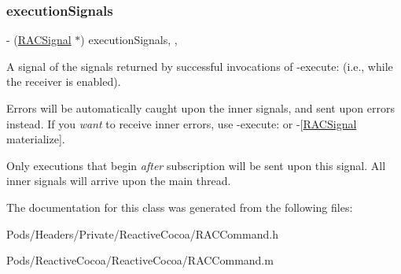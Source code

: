 \subsubsection{\texorpdfstring{execution\+Signals}{executionSignals}}
{\footnotesize\ttfamily -\/ (\mbox{\hyperlink{interface_r_a_c_signal}{R\+A\+C\+Signal}} $\ast$) execution\+Signals\hspace{0.3cm}{\ttfamily [read]}, {\ttfamily [nonatomic]}, {\ttfamily [strong]}}

A signal of the signals returned by successful invocations of -\/execute\+: (i.\+e., while the receiver is {\ttfamily enabled}).

Errors will be automatically caught upon the inner signals, and sent upon {\ttfamily errors} instead. If you {\itshape want} to receive inner errors, use -\/execute\+: or -\/\mbox{[}\mbox{\hyperlink{interface_r_a_c_signal}{R\+A\+C\+Signal}} materialize\mbox{]}.

Only executions that begin {\itshape after} subscription will be sent upon this signal. All inner signals will arrive upon the main thread. 

The documentation for this class was generated from the following files\+:\begin{DoxyCompactItemize}
\item 
Pods/\+Headers/\+Private/\+Reactive\+Cocoa/R\+A\+C\+Command.\+h\item 
Pods/\+Reactive\+Cocoa/\+Reactive\+Cocoa/R\+A\+C\+Command.\+m\end{DoxyCompactItemize}
